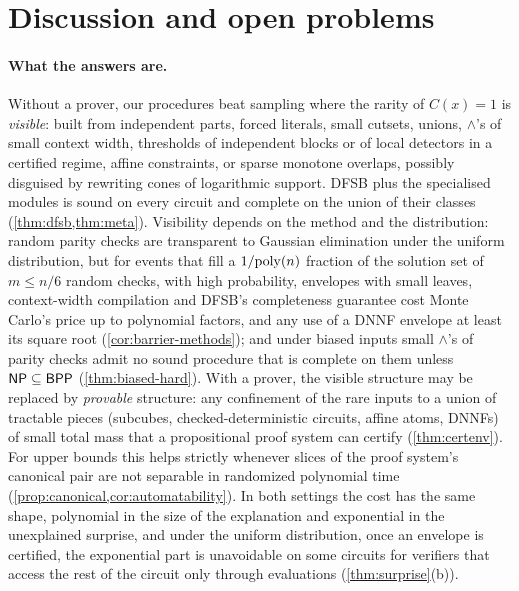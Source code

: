 \section{Discussion and open problems}\label{sec:discussion}

\paragraph{What the answers are.}
Without a prover, our procedures beat sampling where the rarity of $C(x)=1$ is
\emph{visible}: built from independent parts, forced literals, small cutsets,
unions, $\wedge$'s of small context width, thresholds of independent blocks or of
local detectors in a certified regime, affine constraints, or sparse monotone
overlaps, possibly disguised by rewriting cones of logarithmic support. DFSB plus the
specialised modules is sound on every circuit and complete on the union of their
classes (\cref{thm:dfsb,thm:meta}). Visibility depends on the method and the
distribution: random parity checks are transparent to Gaussian elimination under the
uniform distribution, but for events that fill a $1/\mathrm{poly}(n)$ fraction of the solution
set of $m\le n/6$ random checks, with high probability, envelopes with small leaves,
context-width compilation and DFSB's completeness guarantee cost Monte Carlo's price up
to polynomial factors, and any use of a DNNF envelope at least its square root
(\cref{cor:barrier-methods}); and under biased inputs small
$\wedge$'s of parity checks admit no sound procedure that is complete on them unless
$\mathsf{NP}\subseteq\mathsf{BPP}$ (\cref{thm:biased-hard}). With a prover, the visible structure
may be replaced by \emph{provable} structure: any confinement of the rare inputs to a
union of tractable pieces (subcubes, checked-deterministic circuits, affine atoms,
DNNFs) of small total mass that a propositional proof system can certify
(\cref{thm:certenv}). For upper bounds this
helps strictly whenever slices of the proof system's canonical pair are not separable
in randomized polynomial time (\cref{prop:canonical,cor:automatability}). In both
settings the cost has the same shape, polynomial in the size of the explanation and
exponential in the unexplained surprise, and under the uniform distribution, once an
envelope is certified, the exponential part is unavoidable on some circuits for
verifiers that access the rest of the circuit only through evaluations
(\cref{thm:surprise}(b)).

